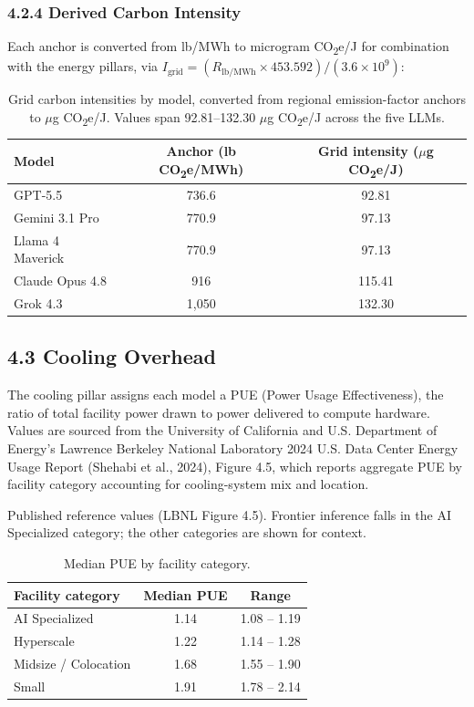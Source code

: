 \documentclass[11pt]{article}
\newcommand{\cotwo}{CO\textsubscript{2}}     %
\begin{document}
\subsubsection*{4.2.4 Derived Carbon Intensity}

Each anchor is converted from lb/MWh to microgram \cotwo e/J for combination with the energy pillars, via $I_{\text{grid}} = (R_{\text{lb/MWh}} \times 453.592)/(3.6 \times 10^{9})$:

\begin{table}[htbp]
  \centering
  \begin{tabular}{@{}l c c@{}}
    \toprule
    \textbf{Model} & \textbf{Anchor (lb \cotwo e/MWh)} & \textbf{Grid intensity ($\mu$g \cotwo e/J)} \\
    \midrule
    GPT-5.5          & 736.6 & 92.81 \\
    Gemini 3.1 Pro   & 770.9 & 97.13 \\
    Llama 4 Maverick & 770.9 & 97.13 \\
    Claude Opus 4.8  & 916   & 115.41 \\
    Grok 4.3         & 1,050 & 132.30 \\
    \bottomrule
  \end{tabular}
  \caption{Grid carbon intensities by model, converted from regional emission-factor anchors to $\mu$g \cotwo e/J. Values span 92.81--132.30 $\mu$g \cotwo e/J across the five LLMs.}
  \label{tab:derived-carbon}
\end{table}

\subsection*{4.3 Cooling Overhead}

The cooling pillar assigns each model a PUE (Power Usage Effectiveness), the ratio of total facility power drawn to power delivered to compute hardware. Values are sourced from the University of California and U.S. Department of Energy's Lawrence Berkeley National Laboratory 2024 U.S. Data Center Energy Usage Report (Shehabi et al., 2024), Figure 4.5, which reports aggregate PUE by facility category accounting for cooling-system mix and location.

Published reference values (LBNL Figure 4.5). Frontier inference falls in the AI Specialized category; the other categories are shown for context.

\begin{table}[htbp]
  \centering
  \begin{tabular}{@{}l c c@{}}
    \toprule
    \textbf{Facility category} & \textbf{Median PUE} & \textbf{Range} \\
    \midrule
    AI Specialized       & 1.14 & 1.08 -- 1.19 \\
    Hyperscale           & 1.22 & 1.14 -- 1.28 \\
    Midsize / Colocation & 1.68 & 1.55 -- 1.90 \\
    Small                & 1.91 & 1.78 -- 2.14 \\
    \bottomrule
  \end{tabular}
  \caption{Median PUE by facility category.}
  \label{tab:pue-ref}
\end{table}
\end{document}
